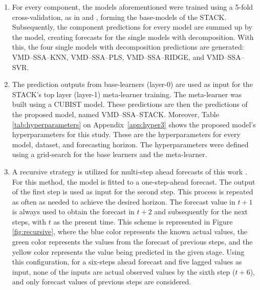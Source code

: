 \begin{enumerate}[start=1,label={\textbf{Step \arabic*:}},wide = 0pt, leftmargin = 3em]
\item For every component, the models aforementioned were trained using a 5-fold cross-validation, as in  and , forming the base-models of the \ac{STACK}. Subsequently, the component predictions for every model are summed up by the model, creating forecasts for the single models with decomposition. With this, the four single models with decomposition predictions are generated: \ac{VMD}--\ac{SSA}--\ac{KNN}, \ac{VMD}--\ac{SSA}--\ac{PLS}, \ac{VMD}--\ac{SSA}--\ac{RIDGE}, and \ac{VMD}--\ac{SSA}--\ac{SVR}.

\item The prediction outputs from base-learners (layer-0) are used as input for the \ac{STACK}'s top layer (layer-1) meta-learner training. The meta-learner was built using a \ac{CUBIST} model. These predictions are then the predictions of the proposed model, named \ac{VMD}--\ac{SSA}--\ac{STACK}. Moreover, Table \ref{tab:hyperparameters} on Appendix~\ref{app:hyper3} shows the proposed model's hyperparameters for this study. These are the hyperparameters for every model, dataset, and forecasting horizon. The hyperparameters were defined using a grid-search for the base learners and the meta-learner.

\item A recursive strategy is utilized for multi-step ahead forecasts of this work \cite{dasilva2021Novel}. For this method, the model is fitted to a one-step-ahead forecast. The output of the first step is used as input for the second step. This process is repeated as often as needed to achieve the desired horizon. The forecast value in $t+1$ is always used to obtain the forecast in $t+2$ and subsequently for the next steps, with $t$ as the present time. This scheme is represented in Figure \ref{fig:recursive}, where the blue color represents the known actual values, the green color represents the values from the forecast of previous steps, and the yellow color represents the value being predicted in the given stage. Using this configuration, for a six-steps ahead forecast and five lagged values as input, none of the inputs are actual observed values by the sixth step ($t+6$), and only forecast values of previous steps are considered.


\end{enumerate}
